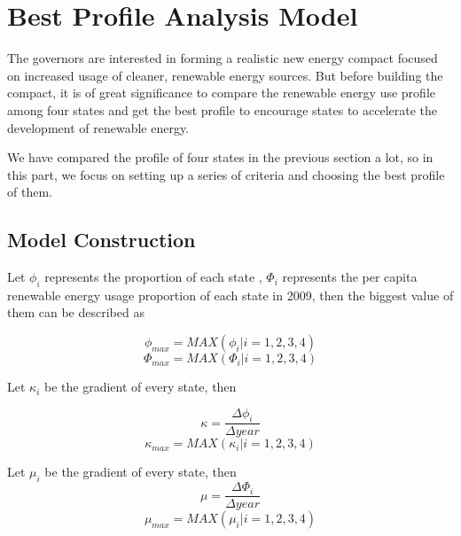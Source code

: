 \documentclass[a4paper,11pt]{article}
\begin{document}
\section{Best Profile Analysis Model}

\par The governors are interested in forming a realistic new energy compact focused on increased usage of cleaner, renewable energy sources. But before building the compact, it is of great significance to compare the renewable energy use profile among four states and get the best profile to encourage states to accelerate the development of renewable energy.

\par We have compared the profile of four states in the previous section a lot, so in this part, we focus on setting up a series of criteria and choosing the best profile of them. 

\subsection{Model Construction}
\par Let $\phi_i$ represents the proportion of each state , $\Phi_i$ represents the per capita renewable energy usage proportion of each state in 2009, then the biggest value of them can be described as

\begin{equation}
    \phi_{max} = MAX({\phi_i|i=1,2,3,4})
\end{equation}
\begin{equation}
    \Phi_{max} = MAX({\Phi_i|i=1,2,3,4})
\end{equation}

\par Let $\kappa_i$ be the gradient of every state, then 

\begin{equation}
    \kappa = \frac{\Delta \phi_i}{\Delta year}
\end{equation}
\begin{equation}
    \kappa_{max} = MAX({\kappa_i | i=1,2,3,4})
\end{equation}

\par Let $\mu_i$ be the gradient of every state, then 
\begin{equation}
    \mu = \frac{\Delta \Phi_i}{\Delta year}
\end{equation}
\begin{equation}
    \mu_{max} = MAX({\mu_i | i=1,2,3,4})
\end{equation}
\end{document}
